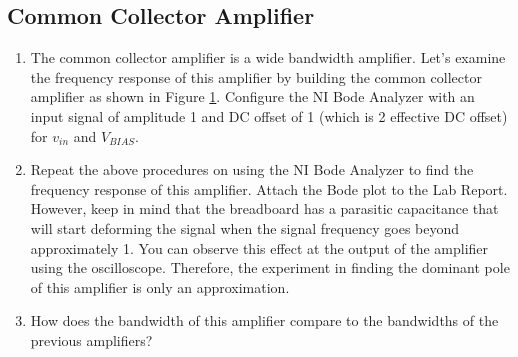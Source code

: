 \documentclass{article}
\begin{document}
\subsection{Common Collector Amplifier}

\begin{enumerate}

	\begin{figure}[!htb]
		
		\centerline{\box\graph}
		\caption{Common collector amplifier test setup}
		\label{commoncollector}
	\end{figure}

	\item The common collector amplifier is a wide bandwidth amplifier. Let's examine the frequency response of this amplifier by building the common collector amplifier as shown in Figure \ref{commoncollector}. Configure the NI Bode Analyzer with an input signal of amplitude \unit{1}{\volt} and DC offset of \unit{1}{\volt} (which is \unit{2}{\volt} effective DC offset) for $v_{in}$ and $V_{BIAS}$.

	\item Repeat the above procedures on using the NI Bode Analyzer to find the frequency response of this amplifier. Attach the Bode plot to the Lab Report. However, keep in mind that the breadboard has a parasitic capacitance that will start deforming the signal when the signal frequency goes beyond approximately \unit{1}{\mega\hertz}. You can observe this effect at the output of the amplifier using the oscilloscope. Therefore, the experiment in finding the dominant pole of this amplifier is only an approximation. 

	\item How does the bandwidth of this amplifier compare to the bandwidths of the previous amplifiers? 

\end{enumerate}
\end{document}
